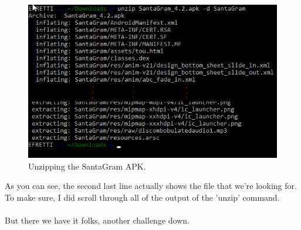 \documentclass[writeup.tex]{subfiles}
\begin{document}
		\begin{figure}[H]
			\centering
			\includegraphics[scale=1]{images/unzip}
			\caption{Unzipping the SantaGram APK.}
			\label{fig.unzip_santagram}
		\end{figure}		
		
		As you can see, the second last line actually shows the file that we're looking for. To make sure, I did scroll through all of the output of the 'unzip' command.\\
		\\
		But there we have it folks, another challenge down.
		
\end{document}
